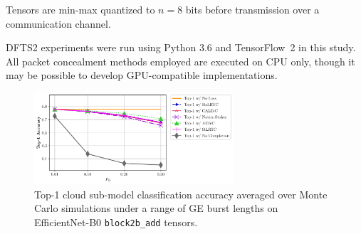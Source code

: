 \documentclass[conference,letterpaper]{IEEEtran}
\begin{document}
Tensors are min-max quantized to $n=8$ bits before transmission over a communication channel.  

DFTS2 experiments were run using Python 3.6 and TensorFlow~2 in this study. All packet concealment methods employed are executed on CPU only, though it may be possible to develop GPU-compatible implementations.

%
%
%
% 
%

\begin{figure}
\centering
\includegraphics[width=7.4cm]{lp_accumulated_vcip_rpp_8_top1_legend.pdf}
    \caption{Top-1 cloud sub-model classification accuracy averaged over Monte Carlo simulations under a range of GE burst lengths on EfficientNet-B0 \texttt{block2b\_add} tensors.}
    \label{fig:efficientnetb0}
\end{figure}
\end{document}
